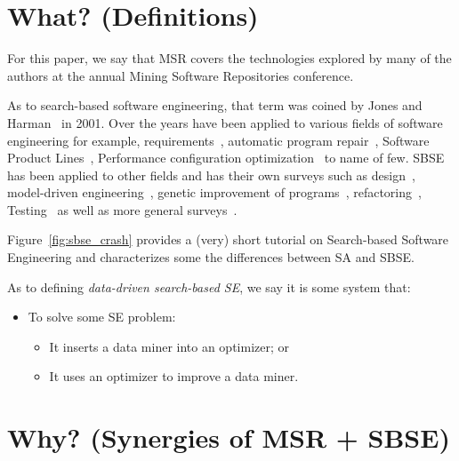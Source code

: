 \documentclass[table, xcdraw, sigconf,review, anonymous]{acmart}
\begin{document}


\section{What? (Definitions)}

For this paper, we say that MSR covers the technologies
explored by many of the authors at the annual Mining Software Repositories
conference.

As to search-based software engineering, that term was coined by Jones and Harman~\cite{harman2001search} in 2001.
Over the years have been applied to various fields of software engineering for example, requirements~\cite{ZhangHL13, chen2017beyond}, automatic program repair~\cite{le2012genprog}, Software Product Lines~\cite{chen2017sampling, sayyad13a, guo2017smtibea}, Performance configuration optimization~\cite{nair2017faster,nair2017using, guo2017data, oh2017finding, nair2018finding} to name of few. SBSE has been applied to other fields and has their own surveys such as design~\cite{raiha2010survey}, model-driven engineering~\cite{boussaid2017survey}, genetic improvement of programs~\cite{petke2017genetic}, refactoring~\cite{mariani2017systematic}, Testing~\cite{silva2017systematic, khari2017extensive} as well as more general surveys~\cite{clarke2003reformulating, harman2007current}. 

 Figure~\ref{fig:sbse_crash} provides a (very) short tutorial on Search-based Software Engineering and  characterizes some the differences between SA and SBSE.
 
As to defining {\em data-driven search-based SE},
we say it is some system that:
\begin{itemize}
\item To solve  some SE problem:
\begin{itemize}
\item
It inserts  a data miner into an optimizer; or
\item
It uses an optimizer  to improve a data  miner.
\end{itemize}
\end{itemize}


\section{  Why? (Synergies of MSR + SBSE)}
\end{document}
